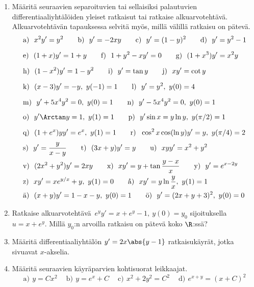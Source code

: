 \Harj
\begin{enumerate}

\item 
Määritä seuraavien separoituvien tai sellaisiksi palautuvien differentiaaliyhtälöiden
yleiset ratkaisut tai ratkaise alkuarvotehtävä. Alkuarvotehtävän tapauksessa selvitä myös,
millä välillä ratkaisu on pätevä.
\begin{align*}
&\text{a)}\ \ x^2 y'=y^2 \qquad 
 \text{b)}\ \ y'=-2xy \qquad 
 \text{c)}\ \ y'=(1-y)^2 \qquad
 \text{d)}\ \ y'=y^2-1 \\[2mm]
&\text{e)}\ \ (1+x)y'=1+y \qquad
 \text{f)}\ \ 1+y^2-xy'=0 \qquad
 \text{g)}\ \ (1+x^3)y'=x^2y \\[2mm]
&\text{h)}\ \ (1-x^2)y'=1-y^2 \qquad
 \text{i)}\ \ y'=\tan y \qquad
 \text{j)}\ \ xy'=\cot y \\[2mm]
&\text{k)}\ \ (x-3)y'=-y,\ y(-1)=1 \qquad
 \text{l)}\ \ y'=y^2,\ y(0)=4 \\[2mm]
&\text{m)}\ \ y'+5x^4y^2=0,\ y(0)=1 \qquad
 \text{n)}\ \ y'-5x^4y^2=0,\ y(0)=1 \\[2mm] 
&\text{o)}\ \ y'\Arctan y=1,\ y(1)=1 \qquad
 \text{p)}\ \ y'\sin x=y\ln y,\ y(\pi/2)=1 \\[2mm]
&\text{q)}\ \ (1+e^x)yy'=e^x,\ y(1)=1 \qquad
 \text{r)}\ \ \cos^2 x\cos(\ln y)y'=y,\ y(\pi/4)=2 \\[1mm]
&\text{s)}\ \ y'=\frac{y}{x-y} \qquad
 \text{t)}\ \ (3x+y)y'=y \qquad
 \text{u)}\ \ xyy'=x^2+y^2 \\
&\text{v)}\ \ (2x^2+y^2)y'=2xy \qquad
 \text{x)}\ \ xy'=y+\tan\frac{y-x}{x} \qquad
 \text{y)}\ \ y'=e^{x-2y} \\  
&\text{z)}\ \ xy'=xe^{y/x}+y,\ y(1)=0 \qquad
 \text{å)}\ \ xy'=y\ln\frac{y}{x},\ y(1)=1 \\
&\text{ä)}\ \ (x+y)y'=1-x-y,\ y(0)=1 \qquad 
 \text{ö)}\ \ y'=(2x+y+3)^2,\ y(0)=0
\end{align*}

\item
Ratkaise alkuarvotehtävä $\,e^y y'=x+e^y-1,\ y(0)=y_0$ sijoituksella $u=x+e^y$. Millä $y_0$:n
arvoilla ratkaisu on pätevä koko $\R$:ssä?

\item
Määritä differentiaaliyhtälön $y'=2x\abs{y-1}$ ratkaisukäyrät, jotka sivuavat $x$-akselia.

\item
Määritä seuraavien käyräparvien kohtisuorat leikkaajat.
\[
\text{a)}\,\ y=Cx^2 \quad\
\text{b)}\,\ y=e^x+C \quad\
\text{c)}\,\ x^2+2y^2=C^2 \quad\
\text{d)}\,\ e^{x+y}=(x+C)^2
\]


\end{enumerate}
